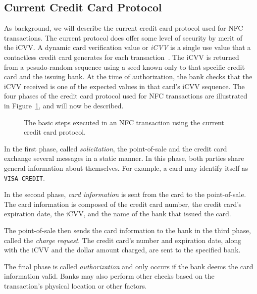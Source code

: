 \documentclass{sig-alternate}
\begin{document}
\subsection{Current Credit Card Protocol}
\label{sec:currentCC}
As background, we will describe the current credit card protocol used for NFC transactions. The current protocol does offer some level of security by merit of the iCVV. A dynamic card verification value or \textit{iCVV} is a single use value that a contactless credit card generates for each transaction~\cite{wiki:iCVV}. The iCVV is returned from a pesudo-random sequence using a seed known only to that specific credit card and the issuing bank. At the time of authorization, the bank checks that the iCVV received is one of the expected values in that card's iCVV sequence. The four phases of the credit card protocol used for NFC transactions are illustrated in Figure~\ref{fig:currentCC}, and will now be described.

\begin{figure}
\centering
{}
\caption{The basic steps executed in an NFC transaction using the current credit card protocol.
\cite{CC2016}}
\label{fig:currentCC}
\end{figure}

In the first phase, called \textit{solicitation}, the point-of-sale and the credit card exchange several messages in a static manner. In this phase, both parties share general information about themselves. For example, a card may identify itself as \texttt{VISA CREDIT}.

In the second phase, \textit{card information} is sent from the card to the point-of-sale. The card information is composed of the credit card number, the credit card's expiration date, the iCVV, and the name of the bank that issued the card.

The point-of-sale then sends the card information to the bank in the third phase, called the \textit{charge request}. The credit card's number and expiration date, along with the iCVV and the dollar amount charged, are sent to the specified bank.

The final phase is called \textit{authorization} and only occurs if the bank deems the card information valid. Banks may also perform other checks based on the transaction's physical location or other factors.
\end{document}
